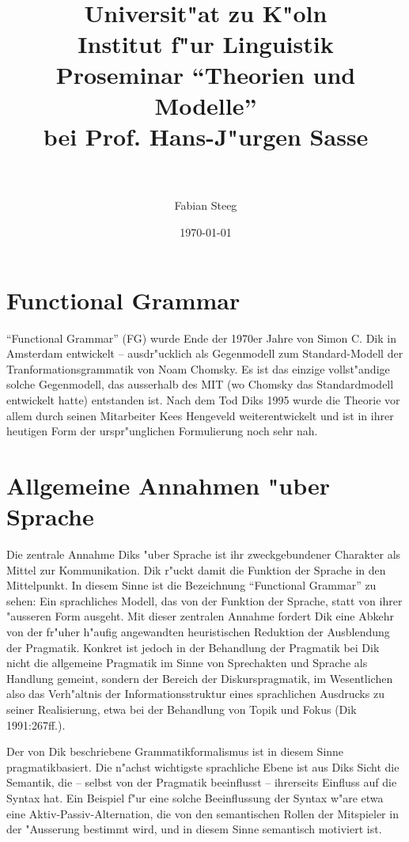 \documentclass[a4paper]{article}
\author{Fabian Steeg}
\date{\today}
\title{\\ \\[10ex]\Large{Universit"at zu K"oln \\ Institut f"ur Linguistik
}\\[5ex] \large{Proseminar ``Theorien und Modelle''\\ bei Prof. Hans-J"urgen
Sasse}\\[10ex]
\LARGE{\noun{Simon C. Diks ``Functional Grammar''}}\\[5ex]}
\begin{document}
\begin{titlepage}
\maketitle
\thispagestyle{empty}

\newpage

\tableofcontents \listoffigures
\thispagestyle{empty}
\end{titlepage}



\section{Functional Grammar}

``Functional Grammar'' (FG) wurde Ende der 1970er Jahre von Simon C. Dik in
Amsterdam entwickelt -- ausdr"ucklich als Gegenmodell zum Standard-Modell der
Tranformationsgrammatik von Noam Chomsky. Es ist das einzige vollst"andige
solche Gegenmodell, das ausserhalb des MIT (wo Chomsky das Standardmodell
ent\-wickelt hatte) ent\-standen ist. Nach dem Tod Diks 1995 wurde die Theorie
vor allem durch seinen Mitarbeiter Kees Hengeveld weiterentwickelt und ist in
ihrer heutigen Form der urspr"unglichen Formulierung noch sehr nah.

\section{Allgemeine Annahmen "uber Sprache} \label{functional} \label{formal}

Die zentrale Annahme Diks "uber Sprache ist ihr zweckgebundener Charakter als
Mittel zur Kommunikation. Dik r"uckt damit die Funktion der Sprache in den
Mittelpunkt. In diesem Sinne ist die Bezeichnung ``Functional Grammar'' zu sehen:
Ein sprachliches Modell, das von der Funktion der Sprache, statt von ihrer
"ausseren Form ausgeht. Mit dieser zentralen Annahme fordert Dik eine Abkehr
von der fr"uher h"aufig angewandten heuristischen Reduktion der Ausblendung der
Pragmatik. Konkret ist jedoch in der Behandlung der Pragmatik bei Dik nicht die
allgemeine Pragmatik im Sinne von Sprechakten und Sprache als Handlung gemeint,
sondern der Bereich der Diskurspragmatik, im Wesentlichen also das Verh"altnis
der Informationsstruktur eines sprachlichen Ausdrucks zu seiner Realisierung,
etwa bei der Behandlung von Topik und Fokus (Dik 1991:267ff.).

Der von Dik beschriebene Grammatikformalismus ist in diesem Sinne
pragmatikbasiert. Die n"achst wichtigste sprachliche Ebene ist aus Diks Sicht
die Semantik, die -- selbst von der Pragmatik beeinflusst -- ihrerseits
Einfluss auf die Syntax hat. Ein Beispiel f"ur eine solche Beeinflussung der
Syntax w"are etwa eine Aktiv-Passiv-Alternation, die von den semantischen
Rollen der Mitspieler in der "Ausserung bestimmt wird, und in diesem Sinne
semantisch motiviert ist.
\end{document}
